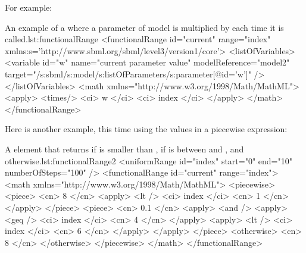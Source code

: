 
For example:

\begin{myXmlLst}{An example of a  where a parameter  of model  is multiplied by  each time it is called.}{lst:functionalRange}
<functionalRange id="current" range="index"
	xmlns:s='http://www.sbml.org/sbml/level3/version1/core'>
	<listOfVariables>
		<variable id="w" name="current parameter value" modelReference="model2"
			target="/s:sbml/s:model/s:listOfParameters/s:parameter[@id='w']" />
	</listOfVariables>
	<math xmlns="http://www.w3.org/1998/Math/MathML">
	  <apply>
	    <times/>
		  <ci> w </ci>
          <ci> index </ci>
      </apply>
	</math>
</functionalRange>
\end{myXmlLst}

Here is another example, this time using the values in a piecewise expression: 

\begin{myXmlLst}{A  element that returns  if  is smaller than ,  if  is between  and , and  otherwise.}{lst:functionalRange2}
<uniformRange id="index" start="0" end="10" numberOfSteps="100" />
<functionalRange id="current" range="index">
	<math xmlns="http://www.w3.org/1998/Math/MathML">
		<piecewise>
			<piece>
				<cn> 8 </cn>
				<apply>
					<lt />
					<ci> index </ci>
					<cn> 1 </cn>
				</apply>
			</piece>
			<piece>
				<cn> 0.1 </cn>
				<apply>
					<and />
					<apply>
						<geq />
                    	<ci> index </ci>
                    	<cn> 4 </cn>
					</apply>
					<apply>
						<lt />
						<ci> index </ci>
						<cn> 6 </cn>
					</apply>
				</apply>
			</piece>
			<otherwise>
				<cn> 8 </cn>
			</otherwise>
		</piecewise>
	</math>
</functionalRange>
\end{myXmlLst}

